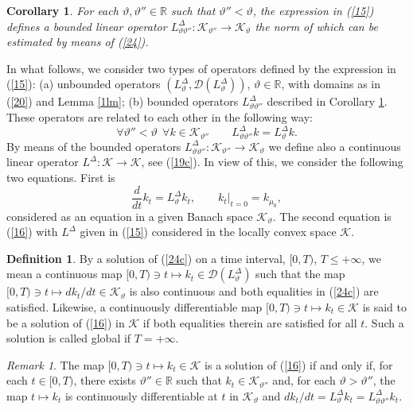 \documentclass[reqno,11pt]{amsart}
\newtheorem{corollary}[theorem]{Corollary}
\theoremstyle{definition}
\newtheorem{definition}[theorem]{Definition}
\theoremstyle{remark}
\newtheorem{remark}[theorem]{Remark}
\numberwithin{equation}{section}
\begin{document}
\begin{corollary}
  \label{Gco}
For each $\vartheta,\vartheta''\in \mathds{R}$ such that
$\vartheta'' < \vartheta$, the expression in (\ref{15}) defines a
bounded linear operator $L^\Delta_{\vartheta\vartheta''}:
\mathcal{K}_{\vartheta''}\to \mathcal{K}_{\vartheta}$ the norm of
which can be estimated by means of (\ref{24}).
\end{corollary}
In what follows, we consider two types of operators defined by the
expression in (\ref{15}): (a) unbounded operators
$(L^\Delta_\vartheta, \mathcal{D}(L^\Delta_\vartheta))$,
$\vartheta\in \mathds{R}$, with domains as in (\ref{20}) and Lemma
\ref{1lm}; (b) bounded operators $L^\Delta_{ \vartheta \vartheta''}$
described in Corollary \ref{Gco}. These operators are related to
each other in the following way:
\begin{equation}
  \label{24a}
\forall \vartheta'' < \vartheta \ \  \forall k \in
\mathcal{K}_{\vartheta''} \qquad L^\Delta_{\vartheta
 \vartheta''} k = L^\Delta_{\vartheta} k.
\end{equation}
 By means of the bounded operators $L^\Delta_{\vartheta
 \vartheta''} : \mathcal{K}_{\vartheta''} \to \mathcal{K}_{\vartheta}$ we
define also a continuous linear operator $L^\Delta:\mathcal{K} \to
\mathcal{K} $, see (\ref{19c}). In view of this, we consider the
following two equations. First is
\begin{equation}
  \label{24c}
\frac{d}{dt} k_t = L^\Delta_\vartheta k_t, \qquad k_t|_{t=0} =
k_{\mu_0},
\end{equation}
considered as an equation in a given Banach space
$\mathcal{K}_{\vartheta}$. The second equation is (\ref{16}) with
$L^\Delta$ given in (\ref{15}) considered in the locally convex
space $\mathcal{K}$.
\begin{definition}
  \label{S1df}
By a solution of (\ref{24c}) on a time interval, $[0,T)$, $T\leq
+\infty$, we mean a continuous map $[0,T)\ni t \mapsto k_t \in
\mathcal{D} (L^\Delta_\vartheta)$ such that the map $[0,T)\ni t
\mapsto d k_t / dt\in \mathcal{K}_\vartheta$ is also continuous and
both equalities in (\ref{24c}) are satisfied. Likewise, a
continuously differentiable map $[0,T)\ni t \mapsto k_t \in
\mathcal{K}$ is said to be a solution of (\ref{16}) in $\mathcal{K}$
if both equalities therein are satisfied for all $t$. Such a
solution is called global if $T=+\infty$.
\end{definition}
\begin{remark}
  \label{D1rk}
The map $[0,T)\ni t\mapsto k_t \in \mathcal{K}$ is a solution of
(\ref{16}) if and only if, for each $t \in [0, T)$, there exists
$\vartheta''\in \mathds{R}$ such that $k_t\in
\mathcal{K}_{\vartheta''}$ and, for each $\vartheta > \vartheta''$,
the map $t\mapsto k_t$ is continuously differentiable at $t$ in
$\mathcal{K}_\vartheta$ and $d k_t/ dt = L^\Delta_\vartheta k_t =
L^\Delta_{\vartheta \vartheta''} k_t$.
\end{remark}
\end{document}
